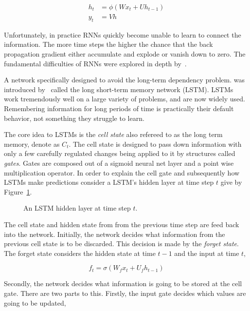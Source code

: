 \begin{align}\label{eq:recurrent_neural_network_equations}
    h_t & = \phi(Wx_t + Uh_{t-1}) \\
    y_t & = Vh
\end{align}

Unfortunately, in practice RNNs quickly become unable to learn to connect the
information. The more time steps the higher the chance that the back propagation
gradient either accumulate and explode or vanish down to zero. The fundamental
difficulties of RNNs were explored in depth by~\cite{Bengio1994}.

A network specifically designed to avoid the long-term dependency problem. was
introduced by~\cite{Hochreiter1997} called the long short-term memory network
(LSTM). LSTMs work tremendously well on a large variety of problems, and are now
widely used. Remembering information for long periods of time is practically
their default behavior, not something they struggle to learn.

The core idea to LSTMs is the \textit{cell state} also refereed to as the
long term memory, denote as \(C_t\). The cell state is designed to pass down
information with only a few carefully regulated changes being applied to it
by structures called \textit{gates}. Gates are composed out of a sigmoid neural
net layer and a point wise multiplication operator. In order to explain
the cell gate and subsequently how LSTMs make predictions consider
a LSTM's hidden layer at time step \(t\) give by Figure~\ref{fig:lstm_cell}.

\begin{figure}[!htbp]
    \centering
    
    \caption{An LSTM hidden layer at time step \(t\).}\label{fig:lstm_cell}
\end{figure}

The cell state and hidden state from from the previous time step are feed back
into the network. Initially, the network decides what information from the
previous cell state is to be discarded. This decision is made by the
\textit{forget state}. The forget state considers the hidden state at time
\(t-1\) and the input at time \(t\),

\begin{equation}\label{eq:forget_gate}
    f_{t} = \sigma(W_{f}x_{t} + U_{f}h_{t-1})
\end{equation}

Secondly, the network decides what information is going to be stored at the
cell gate. There are two parts to this. Firstly, the input gate decides which values
are going to be updated,

